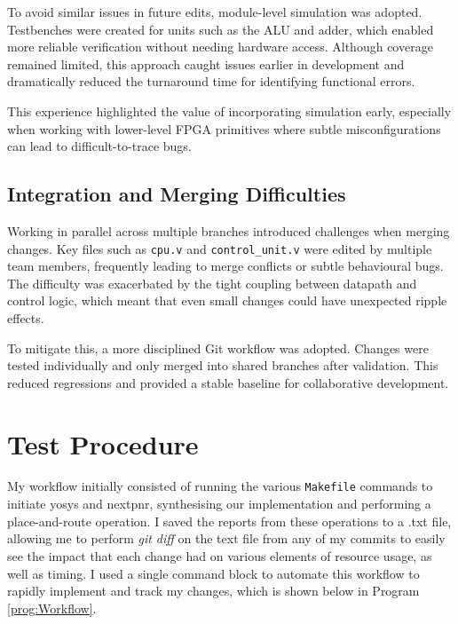 \documentclass[a4paper,10pt]{article}
\begin{document}
To avoid similar issues in future edits, module-level simulation was adopted. 
Testbenches were created for units such as the ALU and adder, 
which enabled more reliable verification without needing hardware access. 
Although coverage remained limited, this approach caught issues 
earlier in development and dramatically reduced the turnaround time 
for identifying functional errors.

This experience highlighted the value of incorporating simulation early, 
especially when working with lower-level FPGA primitives where 
subtle misconfigurations can lead to difficult-to-trace bugs.

\subsection*{Integration and Merging Difficulties}
Working in parallel across multiple branches 
introduced challenges when merging changes. 
Key files such as \texttt{cpu.v} and \texttt{control\_unit.v} 
were edited by multiple team members, 
frequently leading to merge conflicts or subtle behavioural bugs. 
The difficulty was exacerbated by the tight coupling 
between datapath and control logic, 
which meant that even small changes could have unexpected ripple effects.

To mitigate this, a more disciplined Git workflow was adopted. 
Changes were tested individually and only merged 
into shared branches after validation. 
This reduced regressions and provided a stable baseline 
for collaborative development.

\section{Test Procedure}
\label{sec:Test_Procedure}

My workflow initially consisted of running the various \texttt{Makefile}
commands to initiate yosys and nextpnr, 
synthesising our implementation and performing a place-and-route operation.
I saved the reports from these operations to a .txt file, 
allowing me to perform \textit{git diff} on the text file 
from any of my commits to easily see the impact that each change had 
on various elements of resource usage, as well as timing.
I used a single command block to automate this workflow 
to rapidly implement and track my changes, 
which is shown below in Program \ref{prog:Workflow}.
\end{document}
